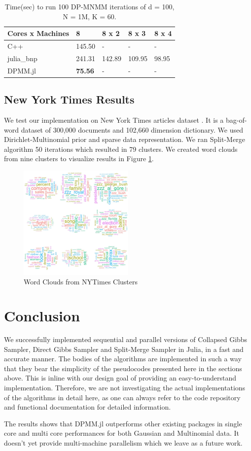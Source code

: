 \documentclass[12pt, a4paper]{article}
\begin{document}
\begin{table}[h!]
\centering
\begin{tabular}{@{}l|l|l|l|l|@{}}
\textbf{Cores x Machines}  & 8      & 8 x 2  & 8 x 3    & 8 x 4    \\ \hline
C++              & 145.50 & -      & -      & -      \\
julia\_bnp       & 241.31 & 142.89 & 109.95  &  98.95\\
DPMM.jl          & \textbf{75.56} & -      & -      & -      \\
\end{tabular}%
\caption{Time(sec) to run 100 DP-MNMM iterations of d = 100, N = 1M, K = 60.}
\label{tab:k60splitmerge}
\end{table}

\subsection{New York Times Results}
We test our implementation on New York Times articles dataset \cite{bache2013uci}. It is a bag-of-word dataset of 300,000 documents and 102,660 dimension dictionary. We used Dirichlet-Multinomial prior and sparse data representation. We ran Split-Merge algorithm 50 iterations which resulted in 79 clusters. We created word clouds from nine clusters to visualize results in Figure \ref{fig:clouds}.

\begin{figure}[H]
\centering
\includegraphics[width=0.5\textwidth]{img/clouds.png}
\caption{Word Clouds from NYTimes Clusters}
\label{fig:clouds}
\end{figure}


\section{Conclusion}

We successfully implemented sequential and parallel versions of Collapsed Gibbs Sampler, Direct Gibbs Sampler and Split-Merge Sampler in Julia, in a fast and accurate manner. The bodies of the algorithms are implemented in such a way that they bear the simplicity of the pseudocodes presented here in the sections above. This is inline with our design goal of providing an easy-to-understand implementation. Therefore, we are not investigating the actual implementations of the algorithms in detail here, as one can always refer to the code repository and functional documentation for detailed information.

The results shows that DPMM.jl outperforms other existing packages in single core and multi core performances for both Gaussian and Multinomial data. It doesn't yet provide multi-machine parallelism which we leave as a future work. 



\end{document}
